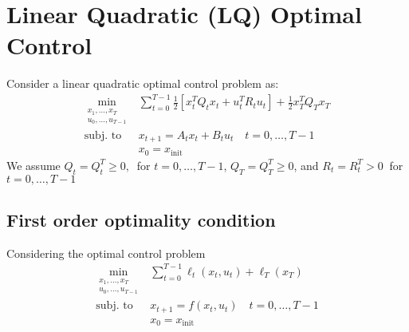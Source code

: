\documentclass[openany]{book}
\theoremstyle{definition}
\theoremstyle{remark}
\begin{document}
\chapter{Linear Quadratic (LQ) Optimal Control}

Consider a linear quadratic optimal control problem as: 
\begin{align*}
        \min_{\substack{x_1,\dots,x_T \\ u_0,\dots,u_{T-1}}} & \displaystyle\sum_{t=0}^{T-1}\displaystyle\frac{1}{2}[x_t^TQ_tx_t+u_t^TR_tu_t] + \displaystyle\frac{1}{2}x_T^TQ_Tx_T\\
        \text{subj. to } & x_{t+1} = A_tx_t + B_tu_t \quad t=0,\dots,T-1\\
                        &x_0 = x_{\text{init}}
\end{align*}
We assume $Q_t=Q_t^T\geq 0,\ $ for $ t=0,\dots,T-1$, $Q_T = Q_T^T \geq 0$, and $R_t=R_t^T > 0 \ $ for $t=0,\dots,T-1$

\section{First order optimality condition}

Considering the optimal control problem
\begin{align*}
        \min_{\substack{x_1,\dots,x_T \\ u_0,\dots,u_{T-1}}} & \displaystyle\sum_{t=0}^{T-1}\displaystyle \ell_t(x_t,u_t) + \ell_T(x_T)\\
        \text{subj. to } & x_{t+1} = f(x_t,u_t) \quad t=0,\dots,T-1\\
                        &x_0 = x_{\text{init}}
\end{align*}
\end{document}
